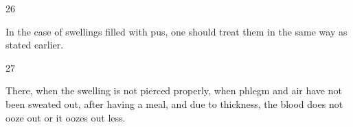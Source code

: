 \begin{translation}
\item[26]

In the case of swellings filled with pus, one should treat them in the same way as stated earlier.

\item[27]

There, when the swelling is not pierced properly, when phlegm and air have not been sweated out, after having a meal, and due to thickness, the blood does not ooze out or it oozes out less.

\end{translation}

